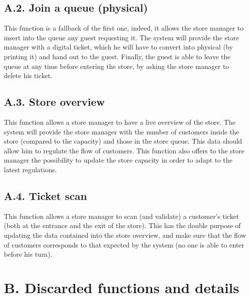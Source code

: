 \subsection{A.2. Join a queue (physical)}

This function is a fallback of the first one, indeed, it allows the store manager to insert into the queue any guest requesting it.
The system will provide the store manager with a digital ticket, which he will have to convert into physical (by printing it) and hand out to the guest.
Finally, the guest is able to leave the queue at any time before entering the store, by asking the store manager to delete his ticket.

\subsection{A.3. Store overview}

This function allows a store manager to have a live overview of the store.
The system will provide the store manager with the number of customers inside the store (compared to the capacity) and those in the store queue.
This data should allow him to regulate the flow of customers.
This function also offers to the store manager the possibility to update the store capacity in order to adapt to the latest regulations.

\clearpage
\subsection{A.4. Ticket scan}

This function allows a store manager to scan (and validate) a customer’s ticket (both at the entrance and the exit of the store).
This has the double purpose of updating the data contained into the store overview, and make sure that the flow of customers corresponds to that expected by the system (no one is able to enter before his turn).

\section{B. Discarded functions and details}

